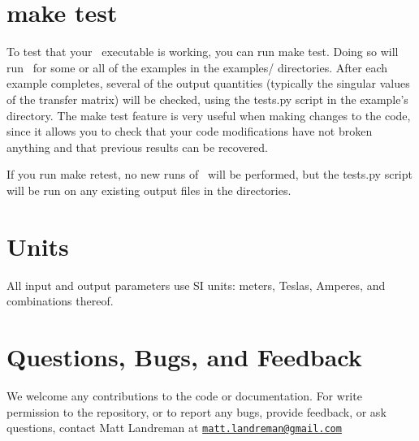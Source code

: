 \section{\ttfamily make test}

To test that your \regcoil~executable is working, you can run {\ttfamily make test}.  Doing so will run
\regcoil~for some or all of the examples in the {\ttfamily examples/} directories.
After each example completes, several of the output quantities (typically the singular values
of the transfer matrix)
will be checked, using the
{\ttfamily tests.py} script in the example's directory.
The {\ttfamily make test} feature is very useful when making changes to the code, since it allows you to check
that your code modifications have not broken anything and that previous results
can be recovered.

If you run {\ttfamily make retest},
no new runs of \regcoil~will be performed, but the {\ttfamily tests.py} script
will be run on any existing output files in the  directories.

\section{Units}

All input and output parameters use SI units: meters, Teslas, Amperes, and combinations thereof.

\section{Questions, Bugs, and Feedback}

We welcome any contributions to the code or documentation.
For write permission to the repository, or to report any bugs, provide feedback, or ask questions, contact Matt Landreman at
\href{mailto:matt.landreman@gmail.com}{\nolinkurl{matt.landreman@gmail.com} }






